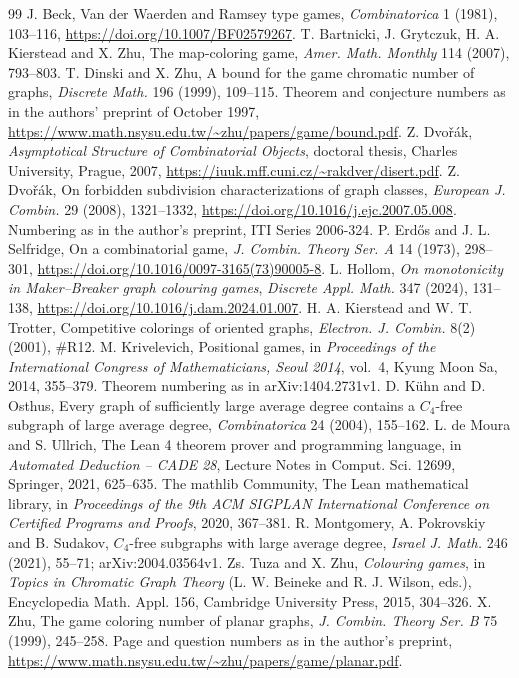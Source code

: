 \documentclass[11pt]{article}
\theoremstyle{remark}
\begin{document}
\begin{thebibliography}{99}
 J. Beck, Van der Waerden and Ramsey type games,
\emph{Combinatorica} 1 (1981), 103--116,
\url{https://doi.org/10.1007/BF02579267}.
 T. Bartnicki, J. Grytczuk, H. A. Kierstead and X. Zhu, The
map-coloring game, \emph{Amer. Math. Monthly} 114 (2007), 793--803.
 T. Dinski and X. Zhu, A bound for the game chromatic number
of graphs, \emph{Discrete Math.} 196 (1999), 109--115. Theorem and
conjecture numbers as in the authors' preprint of October 1997,
\url{https://www.math.nsysu.edu.tw/~zhu/papers/game/bound.pdf}.
 Z. Dvořák, \emph{Asymptotical Structure of Combinatorial
Objects}, doctoral thesis, Charles University, Prague, 2007,
\url{https://iuuk.mff.cuni.cz/~rakdver/disert.pdf}.
 Z. Dvořák, On forbidden subdivision characterizations of
graph classes, \emph{European J. Combin.} 29 (2008), 1321--1332,
\url{https://doi.org/10.1016/j.ejc.2007.05.008}. Numbering
as in the author's preprint, ITI Series 2006-324.
 P. Erdős and J. L. Selfridge, On a combinatorial game,
\emph{J. Combin. Theory Ser. A} 14 (1973), 298--301,
\url{https://doi.org/10.1016/0097-3165(73)90005-8}.
 L. Hollom, \emph{On monotonicity in Maker--Breaker graph colouring
games}, \emph{Discrete Appl. Math.} 347 (2024), 131--138,
\url{https://doi.org/10.1016/j.dam.2024.01.007}.
 H. A. Kierstead and W. T. Trotter, Competitive colorings of
oriented graphs, \emph{Electron. J. Combin.} 8(2) (2001), \#R12.
 M. Krivelevich, Positional games, in \emph{Proceedings of the
International Congress of Mathematicians, Seoul 2014}, vol.~4, Kyung Moon
Sa, 2014, 355--379. Theorem numbering as in arXiv:1404.2731v1.
 D. Kühn and D. Osthus, Every graph of sufficiently large
average degree contains a $C_4$-free subgraph of large average degree,
\emph{Combinatorica} 24 (2004), 155--162.
 L. de Moura and S. Ullrich, The Lean 4 theorem prover and
programming language, in \emph{Automated Deduction -- CADE 28}, Lecture
Notes in Comput. Sci. 12699, Springer, 2021, 625--635.
 The mathlib Community, The Lean mathematical library, in
\emph{Proceedings of the 9th ACM SIGPLAN International Conference on
Certified Programs and Proofs}, 2020, 367--381.
 R. Montgomery, A. Pokrovskiy and B. Sudakov, $C_4$-free
subgraphs with large average degree, \emph{Israel J. Math.} 246 (2021),
55--71; arXiv:2004.03564v1.
 Zs. Tuza and X. Zhu, \emph{Colouring games}, in \emph{Topics in
Chromatic Graph Theory} (L. W. Beineke and R. J. Wilson, eds.),
Encyclopedia Math. Appl. 156, Cambridge University Press, 2015, 304--326.
 X. Zhu, The game coloring number of planar graphs,
\emph{J. Combin. Theory Ser. B} 75 (1999), 245--258. Page and question
numbers as in the author's preprint,
\url{https://www.math.nsysu.edu.tw/~zhu/papers/game/planar.pdf}.
\end{thebibliography}
\end{document}

